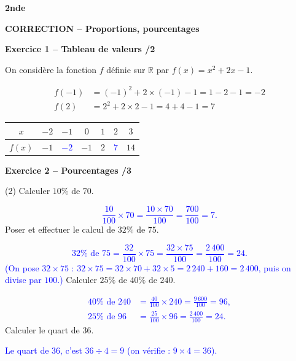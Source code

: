 \documentclass[10pt,a4paper]{article}
\renewcommand{\niveau}{2nde}
\renewcommand{\chapitre}{Proportions, pourcentages}
\renewcommand{\interroversion}[1]{
    \noindent\textbf{\niveau}

    \vspace{-0.5cm}
    \begin{center}
        \textbf{\large CORRECTION -- \chapitre}
    \end{center}

    \vspace{0.1cm}
}
\begin{document}
\newpage


\interroversion{D}

\textbf{Exercice 1 -- Tableau de valeurs \hfill /2}

On considère la fonction \(f\) définie sur \(\mathbb{R}\) par \(f(x)=x^2+2x-1\).

\[
\begin{aligned}
f(-1) &= (-1)^2+2\times(-1)-1 = 1-2-1 = -2\\
f(2)  &= 2^2+2\times 2-1 = 4+4-1 = 7
\end{aligned}
\]

\begin{center}
    \renewcommand{\arraystretch}{1.5}
    \setlength{\tabcolsep}{0.25cm}
    \begin{tabular}{|*{7}{c|}}
    \hline
    \(x\) & \(-2\) & \(-1\) & \(0\) & \(1\) & \(2\) & \(3\) \\
    \hline
    \(f(x)\) & \(-1\) & \textcolor{blue}{\(-2\)} & \(-1\) & \(2\) & \textcolor{blue}{\(7\)} & \(14\) \\
    \hline
    \end{tabular}
\end{center}

\textbf{Exercice 2 -- Pourcentages \hfill /3}

\begin{tasks}(2)
    \task Calculer \(10\%\) de \(70\).

    \textcolor{blue}{
    \[
    \frac{10}{100}\times 70 = \frac{10\times 70}{100} = \frac{700}{100} = 7.
    \]}
    \task Poser et effectuer le calcul de \(32\%\) de \(75\).

    \textcolor{blue}{
    \[
    32\%\text{ de }75 = \frac{32}{100}\times 75 = \frac{32\times 75}{100} = \frac{2\,400}{100} = 24.
    \]
    (On pose \(32\times75\) : \(32\times75=32\times70+32\times5=2\,240+160=2\,400\), puis on divise par \(100\).)}
    \task Calculer \(25\%\) de \(40\%\) de \(240\).

    \textcolor{blue}{
    \[
    \begin{aligned}
    40\%\text{ de }240 &=\frac{40}{100}\times240=\frac{9\,600}{100}=96,\\
    25\%\text{ de }96 &=\frac{25}{100}\times96=\frac{2\,400}{100}=24.
    \end{aligned}
    \]}
    \task Calculer le quart de \(36\).

    \textcolor{blue}{Le quart de \(36\), c'est \(36\div4=9\) (on vérifie : \(9\times4=36\)).}
\end{tasks}
\end{document}
